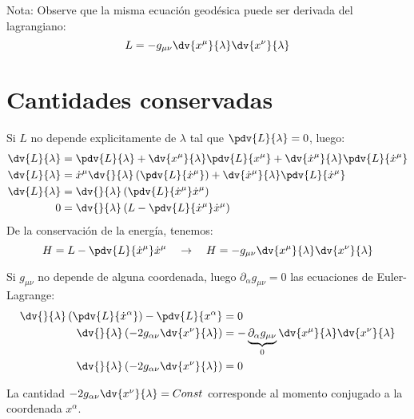 \documentclass[../main]{subfiles}
\begin{document}
\begin{adjustwidth}{0pt}{-100pt}
Nota: Observe que la misma ecuación geodésica puede ser derivada del lagrangiano:
\begin{equation}
    L=-g_{\mu\nu} \dv{x^{\mu}}{\lambda} \dv{x^{\nu}}{\lambda}
    \label{ec3.14}
\end{equation}

\section{Cantidades conservadas}\label{part3.4}
Si $L$ no depende explicitamente de $\lambda$ tal que $\pdv{L}{\lambda}=0$, luego: 
\begin{equation}
    \begin{aligned}
        \dv{L}{\lambda}&=\pdv{L}{\lambda}+\dv{x^{\mu}}{\lambda}\pdv{L}{x^{\mu}}+\dv{\dot{x}^{\mu}}{\lambda}\pdv{L}{\dot{x}^{\mu}}\\
        \dv{L}{\lambda}&=\dot{x}^{\mu}\dv{}{\lambda}\left(\pdv{L}{\dot{x}^{\mu}}\right)+\dv{\dot{x}^{\mu}}{\lambda}\pdv{L}{\dot{x}^{\mu}}\\
        \dv{L}{\lambda}&=\dv{}{\lambda}\left(\pdv{L}{\dot{x}^{\mu}}\dot{x}^{\mu}\right)\\
        0&=\dv{}{\lambda}\left(L-\pdv{L}{\dot{x}^{\mu}}\dot{x}^{\mu}\right)
    \end{aligned}
\end{equation}
De la conservación de la energía, tenemos:
\begin{equation}
    H=L-\pdv{L}{\dot{x}^{\mu}}\dot{x}^{\mu} \quad \rightarrow \quad H=-g_{\mu\nu}\dv{x^{\mu}}{\lambda}\dv{x^{\nu}}{\lambda}
\end{equation}

Si $g_{\mu\nu}$ no depende de alguna coordenada, luego $\partial_{\alpha}g_{\mu\nu}=0$ las ecuaciones de Euler-Lagrange:
\begin{equation}
    \begin{aligned}
        \dv{}{\lambda}\left(\pdv{L}{\dot{x}^{\alpha}}\right)-\pdv{L}{x^{\alpha}}&=0\\
        \dv{}{\lambda}\left(-2g_{\alpha\nu}\dv{x^{\nu}}{\lambda}\right)&=-\underbrace{\partial_{\alpha}g_{\mu\nu}}_{0} \dv{x^{\mu}}{\lambda}\dv{x^{\nu}}{\lambda}\\
        \dv{}{\lambda}\left(-2g_{\alpha\nu}\dv{x^{\nu}}{\lambda}\right)&=0
    \end{aligned}
\end{equation}

La cantidad $-2g_{\alpha\nu}\dv{x^{\nu}}{\lambda}=Const$ corresponde al momento conjugado a la coordenada $x^{\alpha}$.


\end{adjustwidth}
\end{document}
